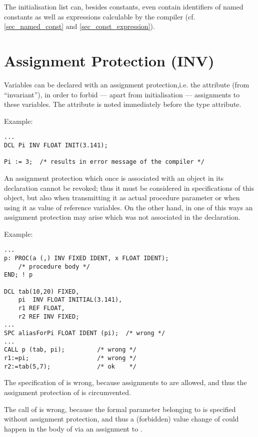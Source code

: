 The initialisation list can, besides constants, even contain identifiers
of named constants as well as expressions calculable by the compiler
(cf. \ref{sec_named_const} and \ref{sec_const_expression}).

\section{Assignment Protection (INV)}    %
\label{sec_inv}

Variables can be declared with an assignment protection,i.e. the attribute
 (from ``invariant''), in order to forbid --- apart from
initialisation --- assignments to these variables. The attribute  is
noted immediately before the type attribute.

Example:

\begin{lstlisting}
...
DCL Pi INV FLOAT INIT(3.141);

Pi := 3;  /* results in error message of the compiler */
\end{lstlisting}

An assignment protection which once is associated with an object in its
declaration cannot be revoked; thus it must be considered in
specifications of this object, but also when transmitting it as actual
procedure parameter or when using it as value of reference variables. On
the other hand, in one of this ways an assignment protection may arise
which was not associated in the declaration.

Example:

\begin{lstlisting}
...
p: PROC(a (,) INV FIXED IDENT, x FLOAT IDENT);
    /* procedure body */
END; ! p
 
DCL tab(10,20) FIXED,
    pi  INV FLOAT INITIAL(3.141),
    r1 REF FLOAT,
    r2 REF INV FIXED;
... 
SPC aliasForPi FLOAT IDENT (pi);  /* wrong */ 
... 
CALL p (tab, pi);         /* wrong */ 
r1:=pi;                   /* wrong */
r2:=tab(5,7);             /* ok    */
\end{lstlisting}

The specification of  is wrong, because assignments to
  are allowed,
and thus the assignment protection of  is circumvented.

The call of  is wrong, because the formal parameter  
belonging to 
is specified without assignment protection, and thus a (forbidden) value
change of  could happen in the body of  
via an assignment to .

